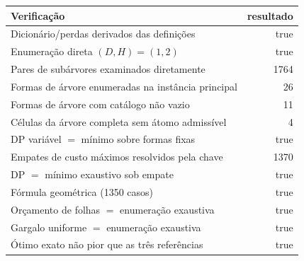 \begin{tabularx}{\linewidth}{@{}Xr@{}}
\toprule
Verificação & resultado \\
\midrule
Dicionário/perdas derivados das definições & true \\
Enumeração direta $(D,H)=(1,2)$ & true \\
Pares de subárvores examinados diretamente & 1764 \\
Formas de árvore enumeradas na instância principal & 26 \\
Formas de árvore com catálogo não vazio & 11 \\
Células da árvore completa sem átomo admissível & 4 \\
DP variável $=$ mínimo sobre formas fixas & true \\
Empates de custo máximos resolvidos pela chave & 1370 \\
DP $=$ mínimo exaustivo sob empate & true \\
Fórmula geométrica (1350 casos) & true \\
Orçamento de folhas $=$ enumeração exaustiva & true \\
Gargalo uniforme $=$ enumeração exaustiva & true \\
Ótimo exato não pior que as três referências & true \\
\bottomrule
\end{tabularx}
